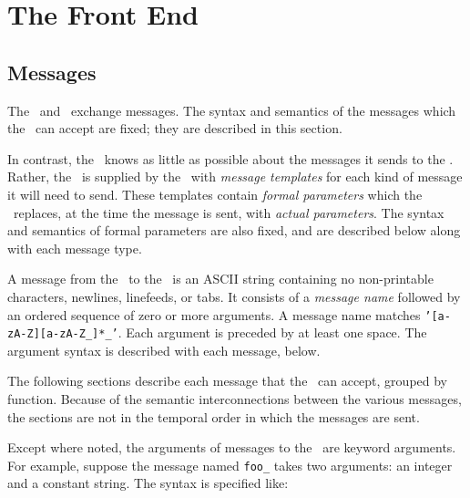 

\section{The Front End}

\subsection{Messages}\label{FEMessages}

\newcommand{\msg}[2]{
\vspace{10pt}
\verb/#1/ {\em #2}
\vspace{10pt}
}

\newcommand{\marg}[1]{{\em #1\/}}


The \FE\ and \SM\ exchange messages. The syntax and semantics of the
messages which the \FE\ can accept are fixed; they are described in
this section.

In contrast, the \FE\ knows as little as possible about the messages it
sends to the \SM. Rather, the \FE\ is supplied by the \SM\ with {\em
message templates} for each kind of message it will need to
send. These templates contain {\em formal parameters} which the \FE\
replaces, at the time the message is sent, with {\em actual
parameters}. The syntax and semantics of formal parameters are also
fixed, and are described below along with each message type.

A message from the \SM\ to the \FE\ is an ASCII string containing no
non-printable characters, newlines, linefeeds, or tabs. It consists of
a {\em message name} followed by an ordered sequence of zero or more
arguments. A message name matches {\tt '[a-zA-Z][a-zA-Z\_]*\_'}. Each
argument is preceded by at least one space. The argument syntax is
described with each message, below.

The following sections describe each message that the \FE\ can accept,
grouped by function.  Because of the semantic interconnections between
the various messages, the sections are not in the temporal order in
which the messages are sent.

Except where noted, the arguments of messages to the \FE\ are keyword
arguments. For example, suppose the message named {\tt foo\_} takes
two arguments: an integer and a constant string. The syntax is
specified like:

